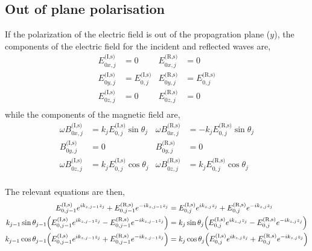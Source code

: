 \subsection{Out of plane polarisation} %
\label{sub:out_of_plane_polarisation}

If the polarization of the electric field is out of the propagration plane ($y$), the components of the electric field for the incident and reflected waves are,
\begin{align*}
	E^{\text{(I,s)}}_{0x,j} & = 0                      & E^{\text{(R,s)}}_{0x,j} & = 0                      \\
	E^{\text{(I,s)}}_{0y,j} & = E^{\text{(I,s)}}_{0,j} & E^{\text{(R,s)}}_{0y,j} & = E^{\text{(R,s)}}_{0,j} \\
	E^{\text{(I,s)}}_{0z,j} & = 0                      & E^{\text{(R,s)}}_{0z,j} & = 0                      \\
\end{align*}
while the components of the magnetic field are,
\begin{align*}
	\omega B^{\text{(I,s)}}_{0x,j} & = k_j E^{\text{(I,s)}}_{0,j}\sin\theta_j & \omega B^{\text{(R,s)}}_{0x,j} & = -k_j E^{\text{(R,s)}}_{0,j}\sin\theta_j \\
	B^{\text{(I,s)}}_{0y,j}        & = 0                                      & B^{\text{(R,s)}}_{0y,j}        & = 0                                       \\
	\omega B^{\text{(I,s)}}_{0z,j} & = k_j E^{\text{(I,s)}}_{0,j}\cos\theta_j & \omega B^{\text{(R,s)}}_{0z,j} & = k_j E^{\text{(R,s)}}_{0,j}\cos\theta_j  \\
\end{align*}

The relevant equations are then,
\begin{align*}
	E^{\text{(I,s)}}_{0,j-1}e^{ik_{z,j-1}z_j} + E^{\text{(R,s)}}_{0,j-1}e^{-ik_{z,j-1}z_j}                               & =
	E^{\text{(I,s)}}_{0,j}e^{ik_{z,j}z_j} + E^{\text{(R,s)}}_{0,j} e^{-ik_{z,j}z_j}
	\\
	k_{j-1}\sin\theta_{j-1}\pqty{E^{\text{(I,s)}}_{0,j-1}e^{ik_{z,j-1}z_j} - E^{\text{(R,s)}}_{0,j-1}e^{-ik_{z,j-1}z_j}} & =
	k_{j}\sin\theta_{j}\pqty{E^{\text{(I,s)}}_{0,j}e^{ik_{z,j}z_j} - E^{\text{(R,s)}}_{0,j}e^{-ik_{z,j}z_j}}
	\\
	k_{j-1}\cos\theta_{j-1}\pqty{E^{\text{(I,s)}}_{0,j-1}e^{ik_{z,j-1}z_j} + E^{\text{(R,s)}}_{0,j-1}e^{-ik_{z,j-1}z_j}} & =
	k_{j}\cos\theta_{j}\pqty{E^{\text{(I,s)}}_{0,j}e^{ik_{z,j}z_j} + E^{\text{(R,s)}}_{0,j}e^{-ik_{z,j}z_j}}
\end{align*}

